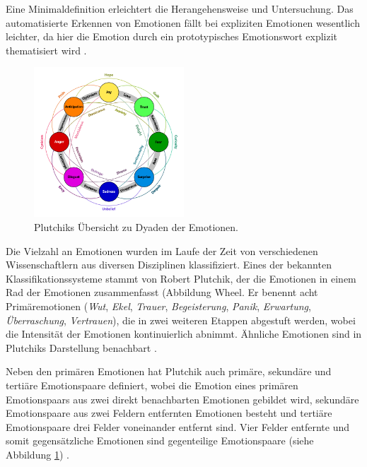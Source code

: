 \documentclass[a4paper,10p]{article}
\begin{document}
Eine Minimaldefinition erleichtert die Herangehensweise und Untersuchung. Das automatisierte Erkennen von Emotionen fällt bei expliziten Emotionen wesentlich leichter, da hier die Emotion durch ein prototypisches Emotionswort explizit thematisiert wird \citep[vgl.][S. 34-41; S. 76-84]{Hillebrandt2011}. \par 

\begin{figure}
	\includegraphics[width=0.5\textwidth]{Plutchik_Dyads.png}
	\caption{Plutchiks Übersicht zu Dyaden der Emotionen.}
	\label{fig:Dyads}
\end{figure}

Die Vielzahl an Emotionen wurden im Laufe der Zeit von verschiedenen Wissenschaftlern aus diversen Disziplinen klassifiziert. Eines der bekannten Klassifikationssysteme stammt von Robert Plutchik, der die Emotionen in einem Rad der Emotionen zusammenfasst (Abbildung {Wheel}. Er benennt acht Primäremotionen (\textit{Wut}, \textit{Ekel}, \textit{Trauer}, \textit{Begeisterung}, \textit{Panik}, \textit{Erwartung}, \textit{Überraschung}, \textit{Vertrauen}), die in zwei weiteren Etappen abgestuft werden, wobei die Intensität der Emotionen kontinuierlich abnimmt. Ähnliche Emotionen sind in Plutchiks Darstellung benachbart \citep[vgl.][S. 40-122]{Plutchik}. 

Neben den primären Emotionen hat Plutchik auch primäre, sekundäre und tertiäre Emotionspaare definiert, wobei die Emotion eines primären Emotionspaars aus zwei direkt benachbarten Emotionen gebildet wird, sekundäre Emotionspaare aus zwei Feldern entfernten Emotionen besteht und tertiäre Emotionspaare drei Felder voneinander entfernt sind. Vier Felder entfernte und somit gegensätzliche Emotionen sind gegenteilige Emotionspaare (siehe Abbildung \ref{fig:Dyads}) \citep[vgl.][S. 40-122]{Plutchik}.\par 
\end{document}
